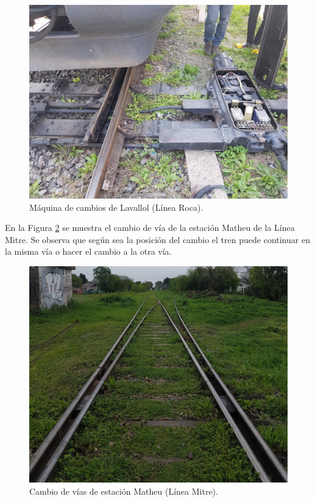 			\begin{figure}[h!]
				\centering
				\includegraphics[scale=.06]{./Figures/Cambio}
				\caption{Máquina de cambios de Lavallol (Línea Roca).}
				\label{fig:Cambio}
			\end{figure} 
			
			\vspace{7cm}
			
			En la Figura \ref{fig:Cambios_2} se muestra el cambio de vía de la estación Matheu de la Línea Mitre. Se observa que según sea la posición del cambio el tren puede continuar en la misma vía o hacer el cambio a la otra vía.
			
			\begin{figure}[h!]
				\centering
				\includegraphics[scale=.1]{./Figures/Cambios_2}
				\caption{Cambio de vías de estación Matheu (Línea Mitre).}
				\label{fig:Cambios_2}
			\end{figure} 
		
